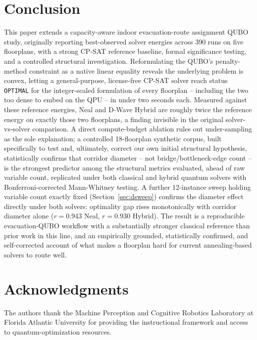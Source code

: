\documentclass[11pt]{article}
\begin{document}
\section{Conclusion}

This paper extends a capacity-aware indoor evacuation-route assignment QUBO study, originally reporting best-observed solver energies across 390 runs on five floorplans, with a strong CP-SAT reference baseline, formal significance testing, and a controlled structural investigation. Reformulating the QUBO's penalty-method constraint as a native linear equality reveals the underlying problem is convex, letting a general-purpose, license-free CP-SAT solver reach status \texttt{OPTIMAL} for the integer-scaled formulation of every floorplan -- including the two too dense to embed on the QPU -- in under two seconds each. Measured against these reference energies, Neal and D-Wave Hybrid are roughly twice the reference energy on exactly those two floorplans, a finding invisible in the original solver-vs-solver comparison. A direct compute-budget ablation rules out under-sampling as the sole explanation; a controlled 18-floorplan synthetic corpus, built specifically to test and, ultimately, correct our own initial structural hypothesis, statistically confirms that corridor diameter -- not bridge/bottleneck-edge count -- is the strongest predictor among the structural metrics evaluated, ahead of raw variable count, replicated under both classical and hybrid quantum solvers with Bonferroni-corrected Mann-Whitney testing. A further 12-instance sweep holding variable count exactly fixed (Section~\ref{sec:dsweep}) confirms the diameter effect directly under both solvers: optimality gap rises monotonically with corridor diameter alone ($r=0.943$ Neal, $r=0.930$ Hybrid). The result is a reproducible evacuation-QUBO workflow with a substantially stronger classical reference than prior work in this line, and an empirically grounded, statistically confirmed, and self-corrected account of what makes a floorplan hard for current annealing-based solvers to route well.

\section*{Acknowledgments}
The authors thank the Machine Perception and Cognitive Robotics Laboratory at Florida Atlantic University for providing the instructional framework and access to quantum-optimization resources.
\end{document}
